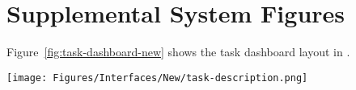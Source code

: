 \section{Supplemental System Figures}
Figure~\ref{fig:task-dashboard-new} shows the task dashboard layout in \system.
\begin{figure*}
    \centering
    \texttt{[image: Figures/Interfaces/New/task-description.png]}
    \caption{The Task Dashboard tab provides an overview of all labeling tasks. This spreadsheet records key details, including the Task ID, Task Tab, Task Creation Time, Prompt Used for the Task, and Total Label Cost. Users can click the hyperlink in the Task Tab column to access the corresponding task tab for more detailed information.}
    \label{fig:task-dashboard-new}
\end{figure*}


